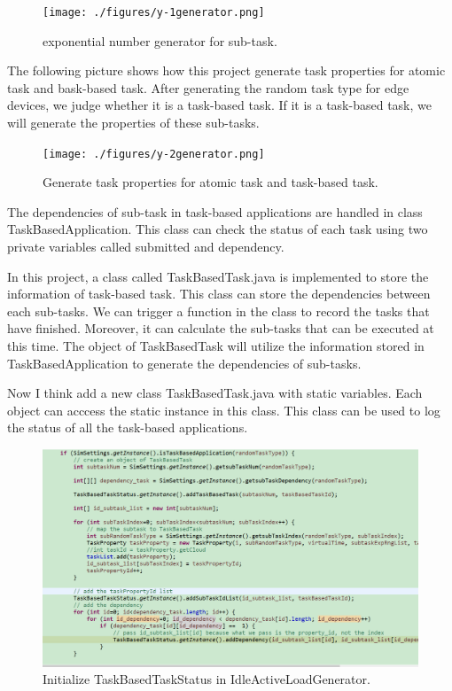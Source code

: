 \begin{figure}
	\centering
	\texttt{[image: ./figures/y-1generator.png]}
	\caption{\label{fig:frog}exponential number generator for sub-task.}
\end{figure}


The following picture shows how this project generate task properties for atomic task and bask-based task. After generating the random task type for edge devices, we judge whether it is a task-based task. If it is a task-based task, we will generate the properties of these sub-tasks.
\begin{figure}
	\centering
	\texttt{[image: ./figures/y-2generator.png]}
	\caption{\label{fig:frog}Generate task properties for atomic task and task-based task.}
\end{figure}

The dependencies of sub-task in task-based applications are handled in class TaskBasedApplication. This class can check the status of each task using two private variables called submitted and dependency. 

In this project, a class called TaskBasedTask.java is implemented to store the information of task-based task. This class can store the dependencies between each sub-tasks. We can trigger a function in the class to record the tasks that have finished. Moreover, it can calculate the sub-tasks that can be executed at this time. The object of TaskBasedTask will utilize the information stored in TaskBasedApplication to generate the dependencies of sub-tasks.


Now I think add a new class TaskBasedTask.java with static variables. Each object can acccess the static instance in this class. This class can be used to log the status of all the task-based applications.

\begin{figure}
	\centering
	\includegraphics[width=1\textwidth]{./figures/IdleActiveLoadGenerator-TaskBasedTask.png}
	\caption{\label{fig:frog}Initialize TaskBasedTaskStatus in IdleActiveLoadGenerator.}
\end{figure}

